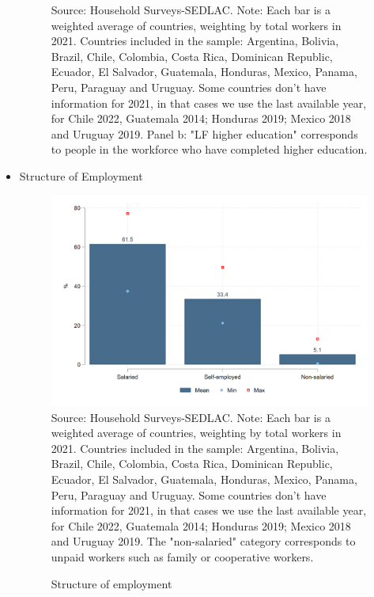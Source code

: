\documentclass[english]{article}
\begin{document}
\begin{itemize}
\begin{figure}[!htb]
\footnotesize{Source: Household Surveys-SEDLAC.}
\footnotesize{Note: Each bar is a weighted average of countries, weighting by total workers in 2021. Countries included in the sample: Argentina, Bolivia, Brazil, Chile, Colombia, Costa Rica, Dominican Republic, Ecuador, El Salvador, Guatemala, Honduras, Mexico, Panama, Peru, Paraguay and Uruguay. Some countries don’t have information for 2021, in that cases we use the last available year, for Chile 2022, Guatemala 2014; Honduras 2019; Mexico 2018 and Uruguay 2019. Panel b: "LF higher education" corresponds to people in the workforce who have completed higher education.}

\end{figure}
  
    \item Structure of Employment
    
        \begin{figure}[!htb]
        \justifying
        \caption{Structure of employment}     
        \includegraphics[scale=.3]{latex/figures/Snapshot/Structure of employment.png}
        \label{fig:employment}
        \footnotesize{Source: Household Surveys-SEDLAC.}
        \footnotesize{Note: Each bar is a weighted average of countries, weighting by total workers in 2021. Countries included in the sample: Argentina, Bolivia, Brazil, Chile, Colombia, Costa Rica, Dominican Republic, Ecuador, El Salvador, Guatemala, Honduras, Mexico, Panama, Peru, Paraguay and Uruguay. Some countries don’t have information for 2021, in that cases we use the last available year, for Chile 2022, Guatemala 2014; Honduras 2019; Mexico 2018 and Uruguay 2019. The "non-salaried" category corresponds to unpaid workers such as family or cooperative workers.}
        \end{figure}


\end{itemize}
\end{document}
